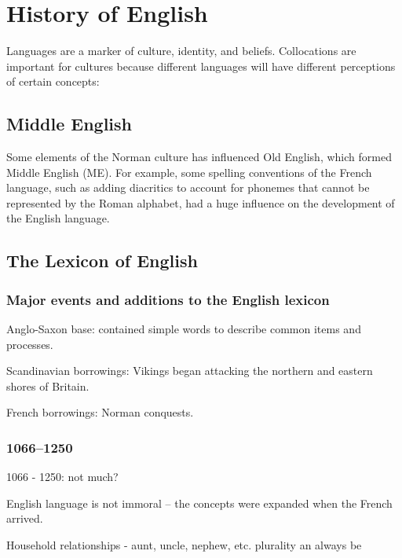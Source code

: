 \documentclass[../main.tex]{subfiles}
\begin{document}
	\chapter{History of English}
	Languages are a marker of culture, identity, and beliefs.
	Collocations are important for cultures because different languages will have different perceptions of certain concepts:

\section{Middle English}
	Some elements of the Norman culture has influenced Old English, which formed Middle English (ME). For example, some spelling conventions of the French language, such as adding diacritics to account for phonemes that cannot be represented by the Roman alphabet, had a huge influence on the development of the English language.

	\section{The Lexicon of English}
	\subsection{Major events and additions to the English lexicon}
	Anglo-Saxon base: contained simple words to describe common items and processes.  \par
	Scandinavian borrowings: Vikings began attacking the northern and eastern shores of Britain.  \par
	French borrowings: Norman conquests. \par
	\subsection{1066--1250}
	1066 - 1250: not much? \par
	English language is not immoral -- the concepts were expanded when the French arrived.  \par
	Household relationships - aunt, uncle, nephew, etc. plurality an always be \par
\end{document}
